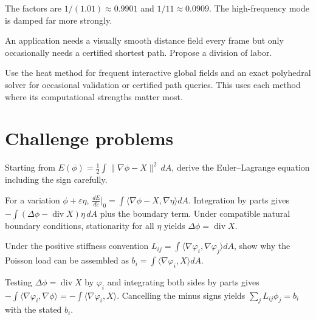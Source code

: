 \begin{solution}
The factors are \(1/(1.01)\approx0.9901\) and \(1/11\approx0.0909\).  The high-frequency mode is damped far more strongly.
\end{solution}

\begin{problem}\label{prob:vii40-12}
An application needs a visually smooth distance field every frame but only occasionally needs a certified shortest path.  Propose a division of labor.
\end{problem}

\begin{solution}
Use the heat method for frequent interactive global fields and an exact polyhedral solver for occasional validation or certified path queries.  This uses each method where its computational strengths matter most.
\end{solution}

\section{Challenge problems}

\begin{problem}\label{prob:vii40-ch01}
Starting from \(E(\phi)=\frac12\int\|\nabla\phi-X\|^2\,dA\), derive the Euler--Lagrange equation including the sign carefully.
\end{problem}

\begin{solution}
For a variation \(\phi+\varepsilon\eta\), \(\frac{dE}{d\varepsilon}|_0=\int\langle\nabla\phi-X,\nabla\eta\rangle dA\).  Integration by parts gives \(-\int(\Delta\phi-\operatorname{div}X)\eta\,dA\) plus the boundary term.  Under compatible natural boundary conditions, stationarity for all \(\eta\) yields \(\Delta\phi=\operatorname{div}X\).
\end{solution}

\begin{problem}\label{prob:vii40-ch02}
Under the positive stiffness convention \(L_{ij}=\int\langle\nabla\varphi_i,\nabla\varphi_j\rangle dA\), show why the Poisson load can be assembled as \(b_i=\int\langle\nabla\varphi_i,X\rangle dA\).
\end{problem}

\begin{solution}
Testing \(\Delta\phi=\operatorname{div}X\) by \(\varphi_i\) and integrating both sides by parts gives \(-\int\langle\nabla\varphi_i,\nabla\phi\rangle=-\int\langle\nabla\varphi_i,X\rangle\).  Cancelling the minus signs yields \(\sum_jL_{ij}\phi_j=b_i\) with the stated \(b_i\).
\end{solution}

